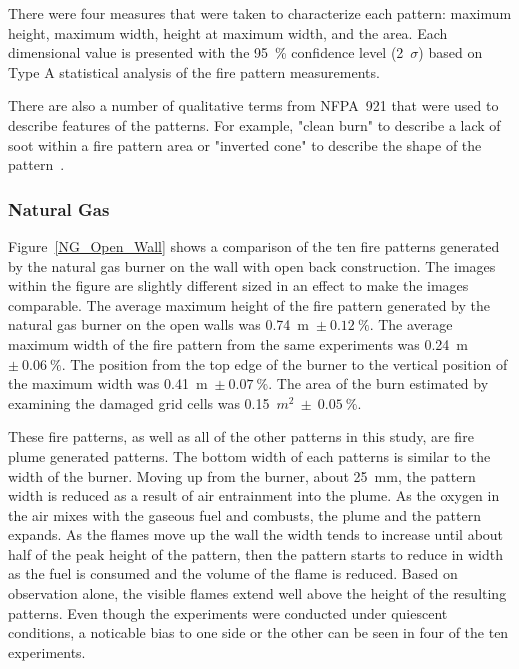 \documentclass[twoside]{uocthesis}
\begin{document}
There were four measures that were taken to characterize each pattern: maximum height, maximum width, height at maximum width, and the area.  Each dimensional value is presented with the 95~\% confidence level (2~$\sigma$) based on Type A statistical analysis of the fire pattern measurements. 

There are also a number of qualitative terms from NFPA~921 that were used to describe features of the patterns.  For example, "clean burn" to describe a lack of soot within a fire pattern area or "inverted cone" to describe the shape of the pattern~\cite{NFPA_921}.      

\subsubsection{Natural Gas}

Figure~\ref{NG_Open_Wall} shows a comparison of the ten fire patterns generated by the natural gas burner on the wall with open back construction.  The images within the figure are slightly different sized in an effect to make the images comparable.
The average maximum height of the fire pattern generated by the natural gas burner on the open walls was 0.74~m~$\pm~0.12~\%$.  The average maximum width of the fire pattern from the same experiments was 0.24~m~$\pm~0.06~\%$.  The position from the top edge of the burner to the vertical position of the maximum width was 0.41~m~$\pm~0.07~\%$. The area of the burn estimated by examining the damaged grid cells was 0.15~$m^2~\pm~0.05~\%$.  

These fire patterns, as well as all of the other patterns in this study, are fire plume generated patterns. The bottom width of each patterns is similar to the width of the burner. Moving up from the burner, about 25~mm, the pattern width is reduced as a result of air entrainment into the plume.  As the oxygen in the air mixes with the gaseous fuel and combusts, the plume and the pattern expands.  As the flames move up the wall the width tends to increase until about half of the peak height of the pattern, then the pattern starts to reduce in width as the fuel is consumed and the volume of the flame is reduced.  Based on observation alone, the visible flames extend well above the height of the resulting patterns.  Even though the experiments were conducted under quiescent conditions, a noticable bias to one side or the other can be seen in four of the ten experiments.           
\end{document}
